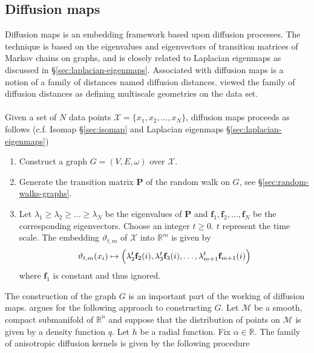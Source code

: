 \subsection{Diffusion maps}
\label{sec:diffusion-maps}
Diffusion maps \citet{coifman06:_diffus_maps} is an embedding
framework based upon diffusion processes. The technique is based on
the eigenvalues and eigenvectors of transition matrices of Markov
chains on graphs, and is closely related to Laplacian eigenmaps as
discussed in \S \ref{sec:laplacian-eigenmaps}. Associated with
diffusion maps is a notion of a family of distances named diffusion
distances. \citet{coifman06:_diffus_maps} viewed the family of
diffusion distances as defining multiscale geometries on the data
set. \\ \\
\noindent
Given a set of $N$ data points $\mathcal{X} = \{x_1,x_2,\dots,x_N\}$,
diffusion maps proceeds as follows (c.f. Isomap \S \ref{sec:isomap}
and Laplacian eigenmaps \S \ref{sec:laplacian-eigenmaps})
\begin{enumerate}
\item Construct a graph $G = (V,E,\omega)$ over $\mathcal{X}$.
\item Generate the transition matrix $\mathbf{P}$ of the random walk
  on $G$, see \S \ref{sec:random-walks-graphs}.
\item Let $\lambda_1 \geq \lambda_2 \geq \dots \geq \lambda_N$ be the
  eigenvalues of $\mathbf{P}$ and $\mathbf{f}_1, \mathbf{f}_2, \dots,
  \mathbf{f}_N$ be the corresponding eigenvectors. Choose an integer
  $t \geq 0$. $t$ represent the time scale. The embedding 
  $\vartheta_{t,m}$ of $\mathcal{X}$ into $\mathbb{R}^{m}$ is given by
  \begin{equation}
    \label{eq:93}
    \vartheta_{t,m}(x_i) \mapsto \Bigl(\lambda_2^{t} \mathbf{f}_2(i), \lambda_3^{t}
    \mathbf{f}_3(i), \dots, \lambda_{m+1}^{t} \mathbf{f}_{m+1}(i) \Bigr)
 \end{equation}
 where $\mathbf{f}_1$ is constant and thus ignored.
\end{enumerate}
The construction of the graph $G$ is an important part of the
working of diffusion maps. \citet{coifman06:_diffus_maps} argues for
the following approach to constructing $G$. Let $\mathcal{M}$ be a
smooth, compact submanifold of $\mathbb{R}^{n}$ and suppose that
the distribution of points on $\mathcal{M}$ is given by a density
function $q$. Let $h$ be a radial function. Fix $\alpha \in
\mathbb{R}$. The family of anisotropic diffusion kernels is given by
the following procedure
